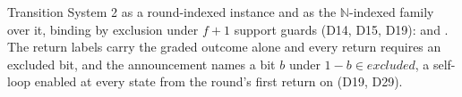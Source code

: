 \begin{definition}
  \label{def:aba-gbca-spec}
  \leanok
  Transition System 2 as a round-indexed instance and as the $\mathbb{N}$-indexed family over it, binding by exclusion under $f{+}1$ support guards (D14, D15, D19):  and .
  The return labels carry the graded outcome alone and every return requires an excluded bit, and the announcement  names a bit $b$ under $1-b \in excluded$, a self-loop enabled at every state from the round's first return on (D19, D29).
\end{definition}
